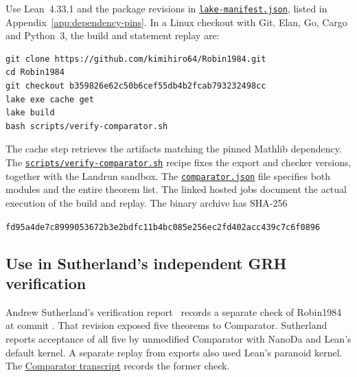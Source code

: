 \documentclass[11pt]{amsart}
\theoremstyle{definition}
\theoremstyle{remark}
\numberwithin{equation}{section}
\newcommand{\repositoryurl}{https://github.com/kimihiro64/Robin1984}
\newcommand{\proofrevision}{b359826e62c50b6cef55db4b2fcab793232498cc}
\newcommand{\codefile}[1]{%
  \href{\repositoryurl/blob/\proofrevision/#1}{\nolinkurl{#1}}}
\begin{document}
Use Lean~4.33.1 and the package revisions in
\codefile{lake-manifest.json}, listed in Appendix~\ref{app:dependency-pins}.
In a Linux checkout with Git, Elan, Go, Cargo and Python~3,
the build and statement replay are:
\begin{verbatim}
git clone https://github.com/kimihiro64/Robin1984.git
cd Robin1984
git checkout b359826e62c50b6cef55db4b2fcab793232498cc
lake exe cache get
lake build
bash scripts/verify-comparator.sh
\end{verbatim}
The cache step retrieves the artifacts matching the pinned
Mathlib dependency. The \codefile{scripts/verify-comparator.sh}
recipe fixes the export and checker versions, together with
the Landrun sandbox. The \codefile{comparator.json} file
specifies both modules and the entire theorem list. The linked
hosted jobs document the actual execution of the build and
replay. The binary archive
\href{\repositoryurl/releases/download/v1.3.0/robin1984-linux-lean-v1.3.0.tar.zst}
{}
has SHA-256
\begin{center}
\texttt{\small fd95a4de7c8999053672b3e2bdfc11b4bc085e256ec2fd402acc439c7c6f0896}
\end{center}

\subsection{Use in Sutherland's independent GRH verification}
\label{sec:external-review}

Andrew Sutherland's verification report~\cite{Sutherland2026}
records a separate check of Robin1984 at commit .
That revision exposed five theorems to Comparator.
Sutherland reports acceptance of all five by unmodified
Comparator with NanoDa and Lean's default kernel. A separate
replay from exports also used Lean's paranoid kernel. The
\href{https://math.mit.edu/~drew/grh/robin1984-comparator-v4.33.0.log}
{Comparator transcript} records the former check.
\end{document}
